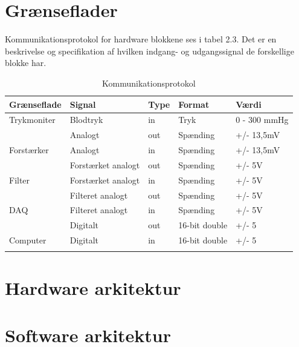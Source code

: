 \section{Grænseflader}
Kommunikationsprotokol for hardware blokkene ses i tabel 2.3. Det er en beskrivelse og specifikation af hvilken indgang- og udgangssignal de forskellige blokke har.   

\begin{longtabu} to 
	\textbf{Grænseflade} & \textbf{Signal} & \textbf{Type} & \textbf{Format} & \textbf{Værdi} \\[-1ex]
	\midrule
	Trykmoniter & Blodtryk & in & Tryk & 0 - 300 mmHg \\[-1ex]
				& Analogt & out & Spænding & +/- 13,5mV \\[-1ex]
	Forstærker  & Analogt & in & Spænding & +/- 13,5mV \\[-1ex]
				& Forstærket analogt & out & Spænding & +/- 5V \\[-1ex]
	Filter 		& Forstærket analogt & in & Spænding & +/- 5V \\				[-1ex]
				& Filteret analogt & out & Spænding & +/- 5V \\[-1ex]
	DAQ			& Filteret analogt & in & Spænding & +/- 5V \\				[-1ex]	
				& Digitalt & out & 16-bit double & +/- 5 \\[-1ex]
	Computer	& Digitalt & in & 16-bit double & +/- 5 \\[-1ex]
	\caption{Kommunikationsprotokol}	
\end{longtabu}


\section{Hardware arkitektur}


\section{Software arkitektur}

